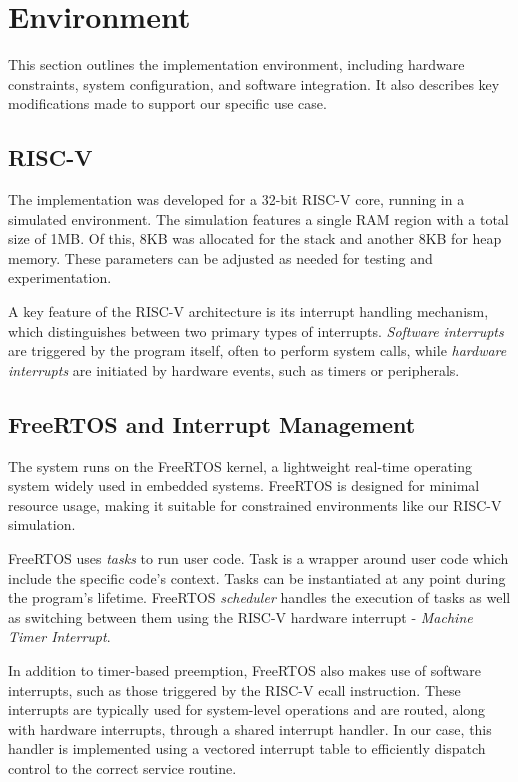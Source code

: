 \section{Environment}

This section outlines the implementation environment, including hardware constraints, system configuration, and software integration. It also describes key modifications made to support our specific use case.

\subsection{RISC-V}

The implementation was developed for a 32-bit RISC-V core, running in a simulated environment. The simulation features a single RAM region with a total size of 1MB. Of this, 8KB was allocated for the stack and another 8KB for heap memory. These parameters can be adjusted as needed for testing and experimentation.

A key feature of the RISC-V architecture is its interrupt handling mechanism, which distinguishes between two primary types of interrupts. \textit{Software interrupts} are triggered by the program itself, often to perform system calls, while \textit{hardware interrupts} are initiated by hardware events, such as timers or peripherals.

\subsection{FreeRTOS and Interrupt Management}

The system runs on the FreeRTOS kernel, a lightweight real-time operating system widely used in embedded systems. FreeRTOS is designed for minimal resource usage, making it suitable for constrained environments like our RISC-V simulation.

FreeRTOS uses \textit{tasks} to run user code. Task is a wrapper around user code which include the specific code's context. Tasks can be instantiated at any point during the program's lifetime. FreeRTOS \textit{scheduler} handles the execution of tasks as well as switching between them using the RISC-V hardware interrupt - \textit{Machine Timer Interrupt}.

In addition to timer-based preemption, FreeRTOS also makes use of software interrupts, such as those triggered by the RISC-V ecall instruction. These interrupts are typically used for system-level operations and are routed, along with hardware interrupts, through a shared interrupt handler. In our case, this handler is implemented using a vectored interrupt table to efficiently dispatch control to the correct service routine.

